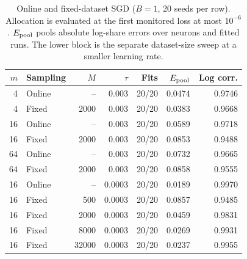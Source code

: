 \begin{table}[htbp]
\centering
\small
\setlength{\tabcolsep}{4pt}
\begin{tabular}{rlrrrrr}
\toprule
$m$ & Sampling & $M$ & $\tau$ & Fits & $E_{\rm pool}$ & Log corr. \\
\midrule
4 & Online & -- & 0.003 & 20/20 & 0.0474 & 0.9746 \\
4 & Fixed & 2000 & 0.003 & 20/20 & 0.0383 & 0.9668 \\
16 & Online & -- & 0.003 & 20/20 & 0.0589 & 0.9718 \\
16 & Fixed & 2000 & 0.003 & 20/20 & 0.0853 & 0.9488 \\
64 & Online & -- & 0.003 & 20/20 & 0.0732 & 0.9665 \\
64 & Fixed & 2000 & 0.003 & 20/20 & 0.0858 & 0.9555 \\
\midrule
16 & Online & -- & 0.0003 & 20/20 & 0.0189 & 0.9970 \\
16 & Fixed & 500 & 0.0003 & 20/20 & 0.0857 & 0.9485 \\
16 & Fixed & 2000 & 0.0003 & 20/20 & 0.0459 & 0.9831 \\
16 & Fixed & 8000 & 0.0003 & 20/20 & 0.0269 & 0.9931 \\
16 & Fixed & 32000 & 0.0003 & 20/20 & 0.0237 & 0.9955 \\
\bottomrule
\end{tabular}
\caption{Online and fixed-dataset SGD ($B=1$, 20 seeds per row). Allocation is evaluated at the first monitored loss at most $10^{-6}$. $E_{\rm pool}$ pools absolute log-share errors over neurons and fitted runs. The lower block is the separate dataset-size sweep at a smaller learning rate.}
\label{tab:h-sampling}
\end{table}
